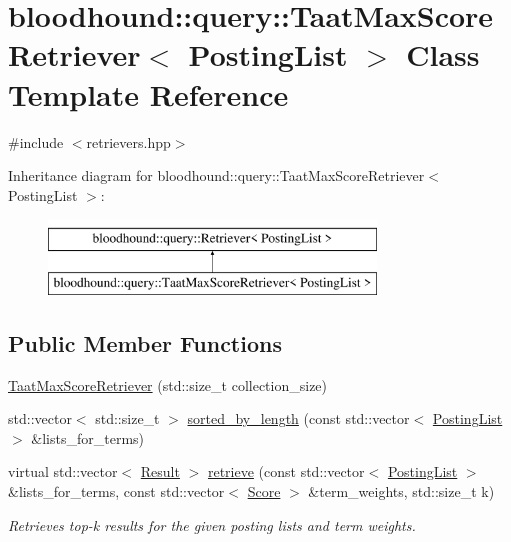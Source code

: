 \hypertarget{classbloodhound_1_1query_1_1TaatMaxScoreRetriever}{}\section{bloodhound\+:\+:query\+:\+:Taat\+Max\+Score\+Retriever$<$ Posting\+List $>$ Class Template Reference}
\label{classbloodhound_1_1query_1_1TaatMaxScoreRetriever}


{\ttfamily \#include $<$retrievers.\+hpp$>$}

Inheritance diagram for bloodhound\+:\+:query\+:\+:Taat\+Max\+Score\+Retriever$<$ Posting\+List $>$\+:\begin{figure}[H]
\begin{center}
\leavevmode
\includegraphics[height=2.000000cm]{classbloodhound_1_1query_1_1TaatMaxScoreRetriever}
\end{center}
\end{figure}
\subsection*{Public Member Functions}
\begin{DoxyCompactItemize}
\item 
\mbox{\hyperlink{classbloodhound_1_1query_1_1TaatMaxScoreRetriever_a8f452aa87a82194bf337e4ce6a06c1f4}{Taat\+Max\+Score\+Retriever}} (std\+::size\+\_\+t collection\+\_\+size)
\item 
std\+::vector$<$ std\+::size\+\_\+t $>$ \mbox{\hyperlink{classbloodhound_1_1query_1_1TaatMaxScoreRetriever_a4c5253dee6541cf173f4f2e16803c702}{sorted\+\_\+by\+\_\+length}} (const std\+::vector$<$ \mbox{\hyperlink{classbloodhound_1_1PostingList}{Posting\+List}} $>$ \&lists\+\_\+for\+\_\+terms)
\item 
virtual std\+::vector$<$ \mbox{\hyperlink{structbloodhound_1_1query_1_1Result}{Result}} $>$ \mbox{\hyperlink{classbloodhound_1_1query_1_1TaatMaxScoreRetriever_af4d96478395b58527969526c3068e7b9}{retrieve}} (const std\+::vector$<$ \mbox{\hyperlink{classbloodhound_1_1PostingList}{Posting\+List}} $>$ \&lists\+\_\+for\+\_\+terms, const std\+::vector$<$ \mbox{\hyperlink{structbloodhound_1_1Score}{Score}} $>$ \&term\+\_\+weights, std\+::size\+\_\+t k)
\begin{DoxyCompactList}\small\item\em Retrieves top-\/k results for the given posting lists and term weights. \end{DoxyCompactList}\end{DoxyCompactItemize}


